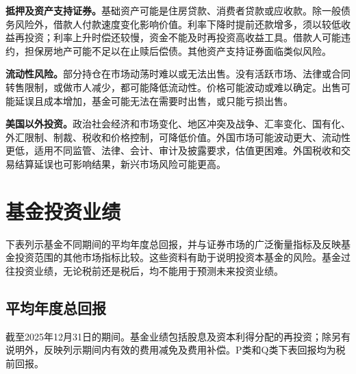 \documentclass[UTF8,fontset=none,11pt,a4paper]{ctexart}
\begin{document}
\textbf{抵押及资产支持证券。}基础资产可能是住房贷款、消费者贷款或应收款。除一般债务风险外，借款人付款速度变化影响价值。利率下降时提前还款增多，须以较低收益再投资；利率上升时偿还较慢，资金不能及时再投资高收益工具。借款人可能违约，担保房地产可能不足以在止赎后偿债。其他资产支持证券面临\allowbreak\mbox{类似风险。}


\textbf{流动性风险。}部分持仓在市场动荡时难以或无法出售。没有活跃市场、法律或合同转售限制，或做市人减少，都可能降低流动性。价格可能波动或难以确定。出售可能延误且成本增加，基金可能无法在需要时出售，或只能\allowbreak\mbox{亏损出售。}


\textbf{美国以外投资。}政治社会经济和市场变化、地区冲突及战争、汇率变化、国有化、外汇限制、制裁、税收和价格控制，可降低价值。外国市场可能波动更大、流动性更低，适用不同监管、法律、会计、审计及披露要求，估值更困难。外国税收和交易结算延误也可影响结果，新兴市场风险\allowbreak\mbox{可能更高。}


\section*{基金投资业绩}
下表列示基金不同期间的平均年度总回报，并与证券市场的广泛衡量指标及反映基金投资范围的其他市场指标比较。这些资料有助于说明投资本基金的风险。基金过往投资业绩，无论税前还是税后，均不能用于预测未来\allowbreak\mbox{投资业绩。}


\subsection*{平均年度总回报}
截至2025年12月31日的期间。基金业绩包括股息及资本利得分配的再投资；除另有说明外，反映列示期间内有效的费用减免及费用补偿。P类和Q类下表回报均为\allowbreak\mbox{税前回报。}
\end{document}
